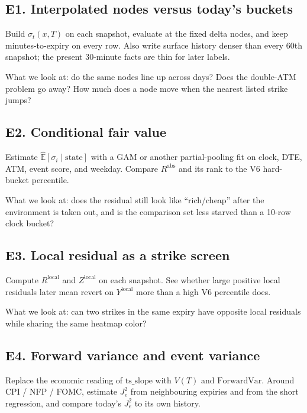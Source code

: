 \documentclass[11pt]{article}
\begin{document}
\subsection{E1. Interpolated nodes versus today's buckets}

Build \(\sigma_t(x,T)\) on each snapshot, evaluate at the fixed
delta nodes, and keep minutes-to-expiry on every row.  Also write
surface history denser than every 60th snapshot; the present
30-minute facts are thin for later labels.

What we look at: do the same nodes line up across days?  Does the
double-ATM problem go away?  How much does a node move when the
nearest listed strike jumps?

\subsection{E2. Conditional fair value}

Estimate \(\widehat{\mathbb{E}}[\sigma_i\mid\mathrm{state}]\) with a
GAM or another partial-pooling fit on clock, DTE, ATM, event score,
and weekday.  Compare \(R^{\mathrm{abs}}\) and its rank to the V6
hard-bucket percentile.

What we look at: does the residual still look like ``rich/cheap''
after the environment is taken out, and is the comparison set less
starved than a 10-row clock bucket?

\subsection{E3. Local residual as a strike screen}

Compute \(R^{\mathrm{local}}\) and \(Z^{\mathrm{local}}\) on each
snapshot.  See whether large positive local residuals later mean
revert on \(Y^{\mathrm{local}}\) more than a high V6 percentile
does.

What we look at: can two strikes in the same expiry have opposite
local residuals while sharing the same heatmap color?

\subsection{E4. Forward variance and event variance}

Replace the economic reading of \(\mathrm{ts\_slope}\) with \(V(T)\)
and \(\mathrm{ForwardVar}\).  Around CPI / NFP / FOMC, estimate
\(J_e^2\) from neighbouring expiries and from the short regression,
and compare today's \(J_e^2\) to its own history.
\end{document}
